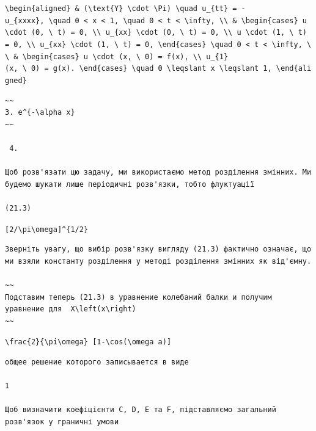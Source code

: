 \documentclass[
  ukrainian,
]{article}
\begin{document}
\texttt{\textbackslash{}begin\{aligned\}\ \&\ (\textbackslash{}text\{Y\}\ \textbackslash{}cdot\ \textbackslash{}Pi)\ \textbackslash{}quad\ u\_\{tt\}\ =\ -u\_\{xxxx\},\ \textbackslash{}quad\ 0\ \textless{}\ x\ \textless{}\ 1,\ \textbackslash{}quad\ 0\ \textless{}\ t\ \textless{}\ \textbackslash{}infty,\ \textbackslash{}\textbackslash{}\ \&\ \textbackslash{}begin\{cases\}\ u\ \textbackslash{}cdot\ (0,\ \textbackslash{}\ t)\ =\ 0,\ \textbackslash{}\textbackslash{}\ u\_\{xx\}\ \textbackslash{}cdot\ (0,\ \textbackslash{}\ t)\ =\ 0,\ \textbackslash{}\textbackslash{}\ u\ \textbackslash{}cdot\ (1,\ \textbackslash{}\ t)\ =\ 0,\ \textbackslash{}\textbackslash{}\ u\_\{xx\}\ \textbackslash{}cdot\ (1,\ \textbackslash{}\ t)\ =\ 0,\ \textbackslash{}end\{cases\}\ \textbackslash{}quad\ 0\ \textless{}\ t\ \textless{}\ \textbackslash{}infty,\ \textbackslash{}\textbackslash{}\ \&\ \textbackslash{}begin\{cases\}\ u\ \textbackslash{}cdot\ (x,\ \textbackslash{}\ 0)\ =\ f(x),\ \textbackslash{}\textbackslash{}\ u\_\{1\}(x,\ \textbackslash{}\ 0)\ =\ g(x).\ \textbackslash{}end\{cases\}\ \textbackslash{}quad\ 0\ \textbackslash{}leqslant\ x\ \textbackslash{}leqslant\ 1,\ \textbackslash{}end\{aligned\}}

\begin{verbatim}
~~
3. e^{-\alpha x}
~~

 4.

Щоб розв'язати цю задачу, ми використаємо метод розділення змінних. Ми будемо шукати лише періодичні розв'язки, тобто флуктуації

(21.3)
\end{verbatim}

\texttt{{[}2/\textbackslash{}pi\textbackslash{}omega{]}\^{}\{1/2\}}

\begin{verbatim}
Зверніть увагу, що вибір розв'язку вигляду (21.3) фактично означає, що ми взяли константу розділення у методі розділення змінних як від'ємну.

~~
Подставим теперь (21.3) в уравнение колебаний балки и получим уравнение для  X\left(x\right)
~~
\end{verbatim}

\texttt{\textbackslash{}frac\{2\}\{\textbackslash{}pi\textbackslash{}omega\}\ {[}1-\textbackslash{}cos(\textbackslash{}omega\ a){]}}

\begin{verbatim}
общее решение которого записывается в виде

1

Щоб визначити коефіцієнти C, D, E та F, підставляємо загальний розв'язок у граничні умови
\end{verbatim}
\end{document}
